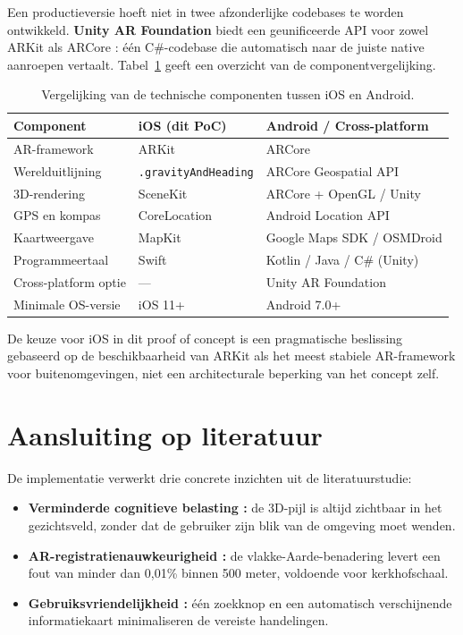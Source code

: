 Een productieversie hoeft niet in twee afzonderlijke codebases te worden ontwikkeld. \textbf{Unity AR Foundation} biedt een geunificeerde API voor zowel ARKit als ARCore \autocite{Technologies2024}: één C\#-codebase die automatisch naar de juiste native aanroepen vertaalt. Tabel~\ref{tab:platform-vergelijking} geeft een overzicht van de componentvergelijking.

\begin{table}[h]
    \centering
    \caption[Platformvergelijking iOS en Android]{Vergelijking van de technische componenten tussen iOS en Android.}
    \label{tab:platform-vergelijking}
    \renewcommand{\arraystretch}{1.4}
    \begin{tabular}{p{3.5cm} p{3.5cm} p{3.5cm}}
        \hline
        \textbf{Component} & \textbf{iOS (dit PoC)} & \textbf{Android / Cross-platform} \\
        \hline
        AR-framework & ARKit & ARCore \\
        \hline
        Werelduitlijning & \texttt{.gravityAndHeading} & ARCore Geospatial API \\
        \hline
        3D-rendering & SceneKit & ARCore + OpenGL / Unity \\
        \hline
        GPS en kompas & CoreLocation & Android Location API \\
        \hline
        Kaartweergave & MapKit & Google Maps SDK / OSMDroid \\
        \hline
        Programmeertaal & Swift & Kotlin / Java / C\# (Unity) \\
        \hline
        Cross-platform optie & --- & Unity AR Foundation \\
        \hline
        Minimale OS-versie & iOS 11+ & Android 7.0+ \\
        \hline
    \end{tabular}
\end{table}

De keuze voor iOS in dit proof of concept is een pragmatische beslissing gebaseerd op de beschikbaarheid van ARKit als het meest stabiele AR-framework voor buitenomgevingen, niet een architecturale beperking van het concept zelf.

\section{Aansluiting op literatuur}

De implementatie verwerkt drie concrete inzichten uit de literatuurstudie:

\begin{itemize}
    \item \textbf{Verminderde cognitieve belasting \autocite{Zhao2025}:} de 3D-pijl is altijd zichtbaar in het gezichtsveld, zonder dat de gebruiker zijn blik van de omgeving moet wenden.
    \item \textbf{AR-registratienauwkeurigheid \autocite{Xu2018}:} de vlakke-Aarde-benadering levert een fout van minder dan 0,01\% binnen 500 meter, voldoende voor kerkhofschaal.
    \item \textbf{Gebruiksvriendelijkheid \autocite{Haekkilae2022}:} één zoekknop en een automatisch verschijnende informatiekaart minimaliseren de vereiste handelingen.
\end{itemize}